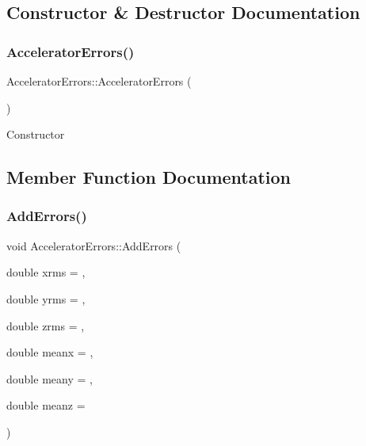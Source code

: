 \subsection{Constructor \& Destructor Documentation}
\mbox{\label{classAcceleratorErrors_a7abb6cc331fd2e15b613c494278fc3a7}} 
\subsubsection{\texorpdfstring{Accelerator\+Errors()}{AcceleratorErrors()}}
{\footnotesize\ttfamily Accelerator\+Errors\+::\+Accelerator\+Errors (\begin{DoxyParamCaption}{ }\end{DoxyParamCaption})\hspace{0.3cm}{\ttfamily [inline]}}

Constructor 

\subsection{Member Function Documentation}
\mbox{\label{classAcceleratorErrors_a1f8965c77693446153115e78259c8f31}} 
\subsubsection{\texorpdfstring{Add\+Errors()}{AddErrors()}}
{\footnotesize\ttfamily void Accelerator\+Errors\+::\+Add\+Errors (\begin{DoxyParamCaption}\item[{double}]{xrms = {},  }\item[{double}]{yrms = {},  }\item[{double}]{zrms = {},  }\item[{double}]{meanx = {},  }\item[{double}]{meany = {},  }\item[{double}]{meanz = {} }\end{DoxyParamCaption})\hspace{0.3cm}{\ttfamily [inline]}}

